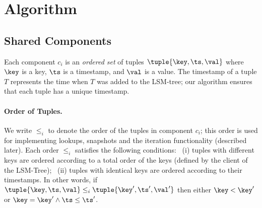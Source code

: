 \section{Algorithm}
\label{sec:algorithm}




\subsection{Shared Components}

Each component $c_i$ is an \emph{ordered set} of tuples $\tuple{\key,\ts,\val}$
where $\key$ is a key, $\ts$ is a timestamp, and $\val$ is a value.
The timestamp of a tuple $T$ represents the time when $T$ was added to the LSM-tree;
our algorithm ensures that each tuple has a unique timestamp.


\paragraph{Order of Tuples.}
We write $\leq_i$ to denote the order of the tuples in component $c_i$;
this order is used for implementing lookups, snapshots and the iteration functionality (described later).  
Each order $\leq_i$ satisfies the following conditions:
~(i) tuples with different keys are ordered according to a total order of the keys (defined by the client of the LSM-Tree);
~(ii) tuples with identical keys are ordered according to their timestamps.
In other words, if $\tuple{\key,\ts,\val} \leq_i  \tuple{\key',\ts',\val'}$ then either $\key < \key'$ or $\key = \key' \wedge \ts \leq \ts'$.

